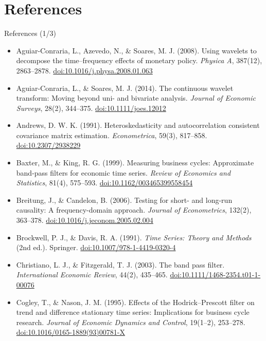 \section{References}

\begin{frame}{References (1/3)}
\itemsize{\tiny}
\begin{itemize}
    \item Aguiar-Conraria, L., Azevedo, N., \& Soares, M. J. (2008). Using wavelets to decompose the time--frequency effects of monetary policy. \textit{Physica A}, 387(12), 2863--2878. \href{https://doi.org/10.1016/j.physa.2008.01.063}{doi:10.1016/j.physa.2008.01.063}
    \item Aguiar-Conraria, L., \& Soares, M. J. (2014). The continuous wavelet transform: Moving beyond uni- and bivariate analysis. \textit{Journal of Economic Surveys}, 28(2), 344--375. \href{https://doi.org/10.1111/joes.12012}{doi:10.1111/joes.12012}
    \item Andrews, D. W. K. (1991). Heteroskedasticity and autocorrelation consistent covariance matrix estimation. \textit{Econometrica}, 59(3), 817--858. \href{https://doi.org/10.2307/2938229}{doi:10.2307/2938229}
    \item Baxter, M., \& King, R. G. (1999). Measuring business cycles: Approximate band-pass filters for economic time series. \textit{Review of Economics and Statistics}, 81(4), 575--593. \href{https://doi.org/10.1162/003465399558454}{doi:10.1162/003465399558454}
    \item Breitung, J., \& Candelon, B. (2006). Testing for short- and long-run causality: A frequency-domain approach. \textit{Journal of Econometrics}, 132(2), 363--378. \href{https://doi.org/10.1016/j.jeconom.2005.02.004}{doi:10.1016/j.jeconom.2005.02.004}
    \item Brockwell, P. J., \& Davis, R. A. (1991). \textit{Time Series: Theory and Methods} (2nd ed.). Springer. \href{https://doi.org/10.1007/978-1-4419-0320-4}{doi:10.1007/978-1-4419-0320-4}
    \item Christiano, L. J., \& Fitzgerald, T. J. (2003). The band pass filter. \textit{International Economic Review}, 44(2), 435--465. \href{https://doi.org/10.1111/1468-2354.t01-1-00076}{doi:10.1111/1468-2354.t01-1-00076}
    \item Cogley, T., \& Nason, J. M. (1995). Effects of the Hodrick--Prescott filter on trend and difference stationary time series: Implications for business cycle research. \textit{Journal of Economic Dynamics and Control}, 19(1--2), 253--278. \href{https://doi.org/10.1016/0165-1889(93)00781-X}{doi:10.1016/0165-1889(93)00781-X}

\end{itemize}
\end{frame}
